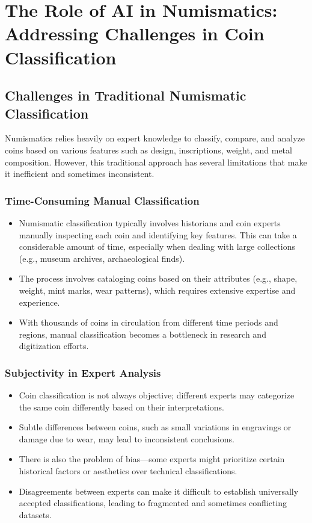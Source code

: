 \documentclass[nolibertine, english, algorithm, nomencl, minted]{ttlab-qualify}
\begin{document}
\section{The Role of AI in Numismatics: Addressing Challenges in Coin Classification}
\subsection{Challenges in Traditional Numismatic Classification}
Numismatics relies heavily on expert knowledge to classify, compare, and analyze coins based on various features such as design, 
inscriptions, weight, and metal composition. However, this traditional approach has several limitations that make it inefficient 
and sometimes inconsistent.

\subsubsection{Time-Consuming Manual Classification}
\begin{itemize}
    \item Numismatic classification typically involves historians and coin experts manually inspecting each coin and identifying key features. 
    This can take a considerable amount of time, especially when dealing with large collections (e.g., museum archives, archaeological finds).

    \item The process involves cataloging coins based on their attributes (e.g., shape, weight, mint marks, wear patterns), 
    which requires extensive expertise and experience.

    \item With thousands of coins in circulation from different time periods and regions, manual classification becomes a 
    bottleneck in research and digitization efforts.
\end{itemize}

\subsubsection{Subjectivity in Expert Analysis}
\begin{itemize}
    \item Coin classification is not always objective; different experts may categorize the same coin differently based on their interpretations.

    \item Subtle differences between coins, such as small variations in engravings or damage due to wear, may lead to inconsistent conclusions.

    \item There is also the problem of bias—some experts might prioritize certain historical factors or aesthetics over technical classifications.

    \item Disagreements between experts can make it difficult to establish universally accepted classifications, leading to fragmented and sometimes conflicting datasets.
\end{itemize}
\end{document}
